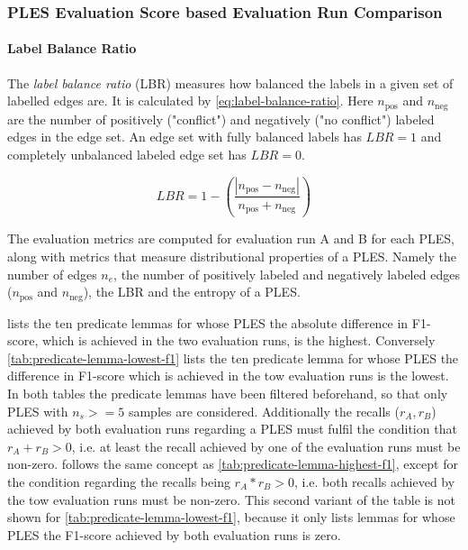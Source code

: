 \documentclass[11pt]{scrreprt}
\begin{document}
\subsubsection{PLES Evaluation Score based Evaluation Run Comparison}

\paragraph{Label Balance Ratio}
The \textit{label balance ratio} (LBR) measures how balanced the labels in a given set of labelled edges are. It is calculated by \cref{eq:label-balance-ratio}. Here \(n_\text{pos}\) and \(n_\text{neg}\) are the number of positively ("conflict") and negatively ("no conflict") labeled edges in the edge set.
An edge set with fully balanced labels has \(LBR = 1\) and completely unbalanced labeled edge set has \(LBR = 0\).

\begin{equation}
LBR = 1 - \left(\frac{\left|n_{\text{pos}} - n_{\text{neg}}\right|}{n_{\text{pos}} + n_{\text{neg}}}\right)
\label{eq:label-balance-ratio}
\end{equation}

The evaluation metrics are computed for evaluation run A and B for each PLES, along with metrics that measure distributional properties of a PLES. Namely the number of edges \(n_e\), the number of positively labeled and negatively labeled edges (\(n_\text{pos}\) and \(n_\text{neg}\)), the LBR  and the entropy of a PLES.

 lists the ten predicate lemmas for whose PLES the absolute difference in F1-score, which is achieved in the two evaluation runs, is the highest. Conversely \cref{tab:predicate-lemma-lowest-f1} lists the ten predicate lemma for whose PLES the difference in F1-score which is achieved in the tow evaluation runs is the lowest. In both tables the predicate lemmas have been filtered beforehand, so that only PLES with \(n_s >= 5\) samples are considered. Additionally the recalls (\(r_A, r_B\)) achieved by both evaluation runs regarding a PLES must fulfil the condition that \(r_A + r_B > 0\), i.e. at least the recall achieved by one of the evaluation runs must be non-zero.  follows the same concept as \cref{tab:predicate-lemma-highest-f1}, except for the condition regarding the recalls being \(r_A * r_B > 0\), i.e. both recalls achieved by the tow evaluation runs must be non-zero. This second variant of the table is not shown for \cref{tab:predicate-lemma-lowest-f1}, because it only lists lemmas for whose PLES the F1-score achieved by both evaluation runs is zero.
\end{document}
